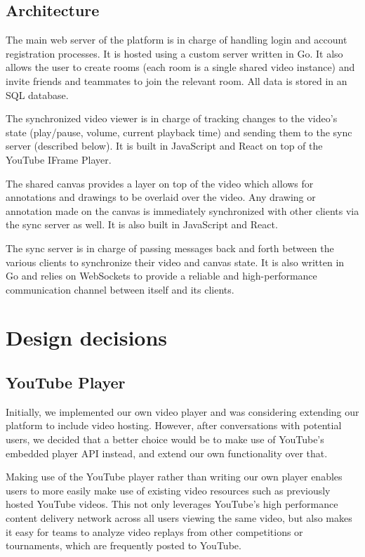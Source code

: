 \documentclass[conference]{IEEEtran}
\begin{document}
\subsection{Architecture}


  The main web server of the platform is in charge of handling login and account registration processes. It is hosted using a custom server written in Go. It also allows the user to create rooms (each room is a single shared video instance) and invite friends and teammates to join the relevant room. All data is stored in an SQL database.

  The synchronized video viewer is in charge of tracking changes to the video's state (play/pause, volume, current playback time) and sending them to the sync server (described below). It is built in JavaScript and React on top of the YouTube IFrame Player.

  The shared canvas provides a layer on top of the video which allows for annotations and drawings to be overlaid over the video. Any drawing or annotation made on the canvas is immediately synchronized with other clients via the sync server as well. It is also built in JavaScript and React.

  The sync server is in charge of passing messages back and forth between the various clients to synchronize their video and canvas state. It is also written in Go and relies on WebSockets to provide a reliable and high-performance communication channel between itself and its clients.

\section{Design decisions}

\subsection{YouTube Player}

  Initially, we implemented our own video player and was considering extending our platform to include video hosting. However, after conversations with potential users, we decided that a better choice would be to make use of YouTube's embedded player API instead, and extend our own functionality over that.

  Making use of the YouTube player rather than writing our own player enables users to more easily make use of existing video resources such as previously hosted YouTube videos. This not only leverages YouTube's high performance content delivery network across all users viewing the same video, but also makes it easy for teams to analyze video replays from other competitions or tournaments, which are frequently posted to YouTube.
\end{document}
